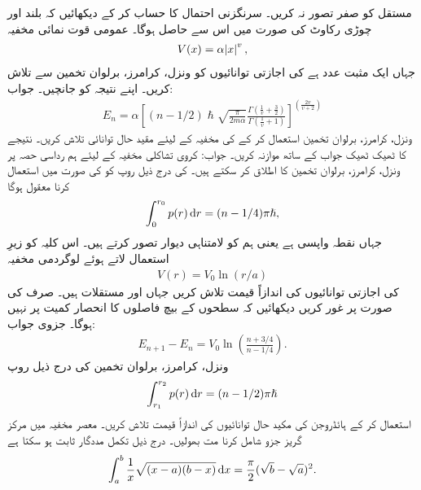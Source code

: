 مستقل  کو صفر تصور نہ کریں۔ سرنگزنی احتمال  کا حساب کر کے دیکھائیں کہ بلند اور چوڑی رکاوٹ کی صورت میں اس سے  حاصل ہوگا۔
عمومی قوت نمائی مخفیہ 
\begin{align*}
	V(x)=\alpha\abs{x}^{v},
\end{align*}
جہاں  ایک مثبت عدد ہے کی اجازتی توانائیوں کو ونزل، کرامرز، برلوان تخمین سے تلاش کریں۔ اپنے نتیجہ کو  جانچیں۔ جواب:
\begin{align}
	E_{n}=\alpha\left[(n-1/2)\hslash\sqrt{\frac{\pi}{2m\alpha}}\frac{\Gamma\left(\frac{1}{v}+\frac{3}{2}\right)}{\Gamma\left(\frac{1}{v}+1\right)}\right]^{\left(\frac{2v}{v+2}\right)}
\end{align}
ونزل، کرامرز، برلوان تخمین استعمال کر کے  کی مخفیہ کے لیئے مقید حال توانائی تلاش کریں۔ نتیجے کا ٹھیک ٹھیک جواب کے ساتھ موازنہ کریں۔ جواب: 
کروی تشاکلی مخفیہ کے لیئے ہم رداسی حصہ  پر ونزل، کرامرز، برلوان تخمین کا اطلاق کر سکتے ہیں۔  کی درج ذیل روپ کو  کی صورت میں استعمال کرنا معقول ہوگا 
\begin{align}
	\int^{r_{0}}_{0}p(r)\dif r=(n-1/4)\pi\hslash,
\end{align}
جہاں  نقطہ واپسی ہے یعنی ہم  کو لامتناہی دیوار تصور کرتے ہیں۔ اس کلیہ کو زیرِ استعمال لاتے ہوئے لوگردمی مخفیہ 
\begin{align*}
	V(r)=V_{0}\ln(r/a)
\end{align*}
کی اجازتی توانائیوں کی اندازاً قیمت تلاش کریں جہاں  اور  مستقلات ہیں۔ صرف  کی صورت پر غور کریں دیکھائیں کہ سطحوں کے بیچ فاصلوں کا انحصار کمیت پر نہیں ہوگا۔ جزوی جواب:
\begin{align*}
	E_{n+1}-E_{n}=V_{0}\ln\left(\frac{n+3/4}{n-1/4}\right).
\end{align*}
ونزل، کرامرز، برلوان تخمین کی درج ذیل روپ
\begin{align}
	\int^{r_{2}}_{r_{1}}p(r)\dif r=(n-1/2)\pi\hslash
\end{align}
استعمال کر کے ہائڈروجن کی مکید حال توانائیوں کی اندازاً قیمت تلاش کریں۔ معصر مخفیہ  میں مرکز گریز جزو شامل کرنا مت بھولیں۔ درج ذیل تکمل مددگار ثابت ہو سکتا ہے
\begin{align}
	\int^{b}_{a}\frac{1}{x}\sqrt{(x-a)(b-x)}\dif x=\frac{\pi}{2}(\sqrt{b}-\sqrt{a})^{2}.
\end{align}
